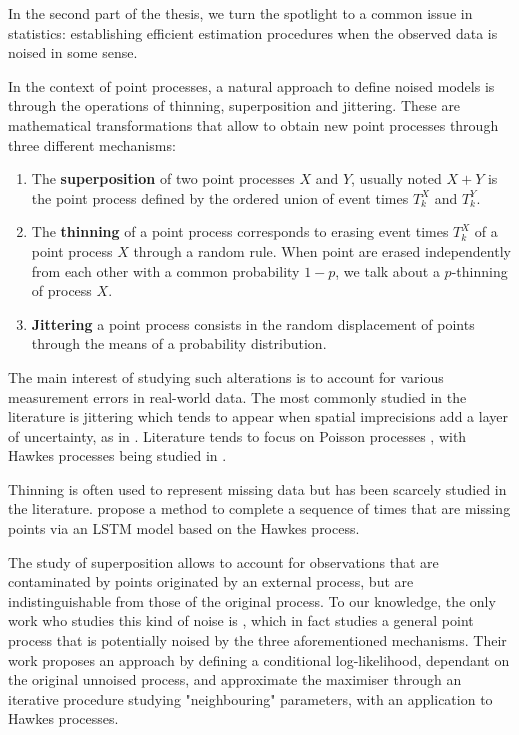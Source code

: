   In the second part of the thesis, we turn the spotlight to a common issue in statistics: 
  establishing efficient estimation procedures when the observed data is noised in some sense.

  In the context of point processes, a natural approach to define noised models is through the operations of thinning, superposition and jittering.
  These are mathematical transformations that allow to obtain new point processes through three different mechanisms:
  \begin{enumerate}
    \item The \textbf{superposition} of two point processes $X$ and $Y$, usually noted $X+Y$ is the point process defined by the ordered union of event times $T_k^X$ and $T_k^Y$.
    \item The \textbf{thinning} of a point process corresponds to erasing event times $T_k^X$ of a point process $X$ through a random rule.
    When point are erased independently from each other with a common probability $1-p$, we talk about a $p$-thinning of process $X$.
    \item \textbf{Jittering} a point process consists in the random displacement of points through the means of a probability distribution.
  \end{enumerate}

  The main interest of studying such alterations is to account for various measurement errors in real-world data. 
  The most commonly studied in the literature is jittering which tends to appear when spatial imprecisions add a layer of uncertainty, as in \parencite{Bonnet2022}. 
  Literature tends to focus on Poisson processes \parencite{Antoniadis2006, Hohage2016},
  with Hawkes processes being studied in \parencite{Trouleau2019, Deutsch2020}.

  Thinning is often used to represent missing data but has been scarcely studied in the literature. \textcite{Mei2019} propose a method to complete a sequence of times that are missing points via an LSTM model based on the Hawkes process.
  
  The study of superposition allows to account for observations that are contaminated by points originated by an external process, but are indistinguishable from those of the original process. 
  To our knowledge, the only work who studies this kind of noise is \textcite{Lund2000}, which in fact studies a general point process that is potentially noised by the three aforementioned mechanisms.
  Their work proposes an approach by defining a conditional log-likelihood, dependant on the original unnoised process, and approximate the maximiser through an iterative procedure studying "neighbouring" parameters, with an application to Hawkes processes.

